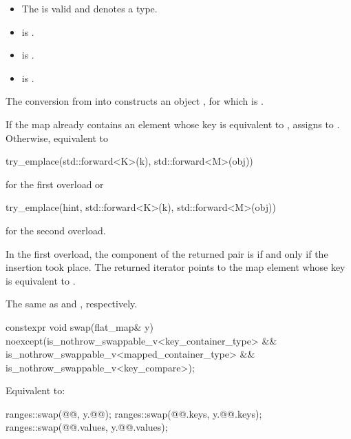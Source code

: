 \begin{itemdescr}
\pnum
\constraints
\begin{itemize}
\item
The  
is valid and denotes a type.
\item
{} is .
\item
{} is .
\item
{} is .
\end{itemize}

\pnum
\expects
The conversion from  into  constructs
an object , for which  is .

\pnum
\effects
If the map already contains an element 
whose key is equivalent to ,
assigns  to .
Otherwise, equivalent to
\begin{codeblock}
try_emplace(std::forward<K>(k), std::forward<M>(obj))
\end{codeblock}
for the first overload or
\begin{codeblock}
try_emplace(hint, std::forward<K>(k), std::forward<M>(obj))
\end{codeblock}
for the second overload.

\pnum
\returns
In the first overload,
the  component of the returned pair is 
if and only if the insertion took place.
The returned iterator points to the map element
whose key is equivalent to .

\pnum
\complexity
The same as  and , respectively.
\end{itemdescr}

%
\begin{itemdecl}
constexpr void swap(flat_map& y)
  noexcept(is_nothrow_swappable_v<key_container_type> &&
           is_nothrow_swappable_v<mapped_container_type> &&
           is_nothrow_swappable_v<key_compare>);
\end{itemdecl}

\begin{itemdescr}
\pnum
\effects
Equivalent to:
\begin{codeblock}
ranges::swap(@@, y.@@);
ranges::swap(@@.keys, y.@@.keys);
ranges::swap(@@.values, y.@@.values);
\end{codeblock}
\end{itemdescr}

